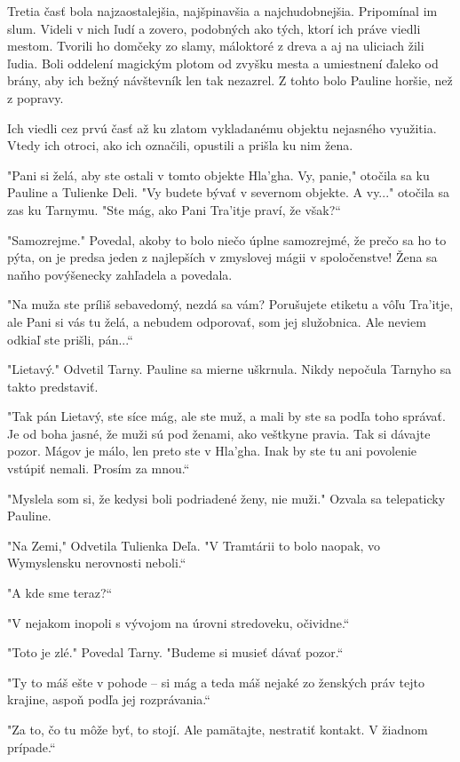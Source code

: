 \documentclass{book}
\begin{document}
Tretia časť bola najzaostalejšia, najšpinavšia a najchudobnejšia. Pripomínal im slum. Videli v nich ľudí a zovero, podobných ako tých, ktorí ich práve viedli mestom. Tvorili ho domčeky zo slamy, máloktoré z dreva a aj na uliciach žili ľudia. Boli oddelení magickým plotom od zvyšku mesta a umiestnení ďaleko od brány, aby ich bežný návštevník len tak nezazrel. Z tohto bolo Pauline horšie, než z popravy.

Ich viedli cez prvú časť až ku zlatom vykladanému objektu nejasného využitia. Vtedy ich otroci, ako ich označili, opustili a prišla ku nim žena.

"$ $Pani si želá, aby ste ostali v tomto objekte Hla'gha. Vy, panie,"$ $ otočila sa ku Pauline a Tulienke Deli. "$ $Vy budete bývať v severnom objekte. A vy..."$ $ otočila sa zas ku Tarnymu. "$ $Ste mág, ako Pani Tra'itje praví, že však?“

"$ $Samozrejme."$ $ Povedal, akoby to bolo niečo úplne samozrejmé, že prečo sa ho to pýta, on je predsa jeden z najlepších v zmyslovej mágii v spoločenstve! Žena sa naňho povýšenecky zahľadela a povedala.

"$ $Na muža ste príliš sebavedomý, nezdá sa vám? Porušujete etiketu a vôľu Tra'itje, ale Pani si vás tu želá, a nebudem odporovať, som jej služobnica. Ale neviem odkiaľ ste prišli, pán...“

"$ $Lietavý."$ $ Odvetil Tarny. Pauline sa mierne uškrnula. Nikdy nepočula Tarnyho sa takto predstaviť.

"$ $Tak pán Lietavý, ste síce mág, ale ste muž, a mali by ste sa podľa toho správať. Je od boha jasné, že muži sú pod ženami, ako veštkyne pravia. Tak si dávajte pozor. Mágov je málo, len preto ste v Hla'gha. Inak by ste tu ani povolenie vstúpiť nemali. Prosím za mnou.“

"$ $Myslela som si, že kedysi boli podriadené ženy, nie muži."$ $ Ozvala sa telepaticky Pauline.

"$ $Na Zemi,"$ $ Odvetila Tulienka Deľa. "$ $V Tramtárii to bolo naopak, vo Wymyslensku nerovnosti neboli.“

"$ $A kde sme teraz?“

"$ $V nejakom inopoli s vývojom na úrovni stredoveku, očividne.“

"$ $Toto je zlé."$ $ Povedal Tarny. "$ $Budeme si musieť dávať pozor.“

"$ $Ty to máš ešte v pohode – si mág a teda máš nejaké zo ženských práv tejto krajine, aspoň podľa jej rozprávania.“

"$ $Za to, čo tu môže byť, to stojí. Ale pamätajte, nestratiť kontakt. V žiadnom prípade.“
\end{document}
